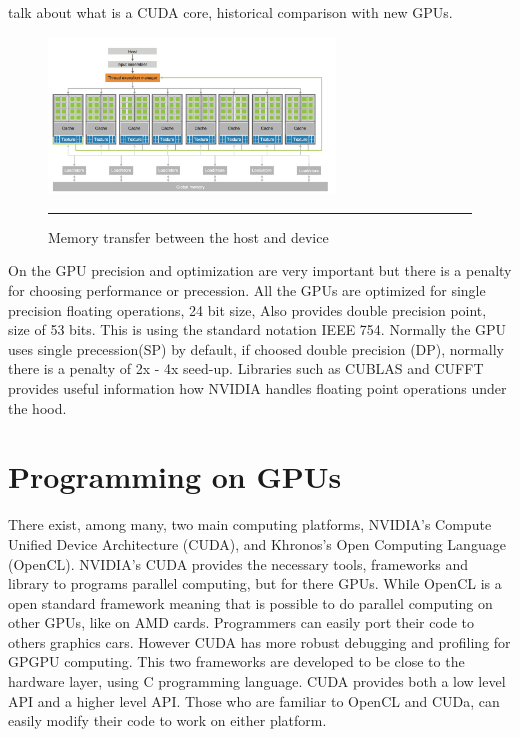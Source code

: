 talk about what is a CUDA core, historical comparison with new GPUs.

\begin{figure}[htbp]
	\centering
		\includegraphics[width=0.68\textwidth]{Figures/arch.png}
		\rule{35em}{0.5pt}
	\caption[Host and Device]{Memory transfer between the host and device}
	\label{fig:arch}
\end{figure}



On the GPU precision and optimization are very important but there is a penalty for choosing performance or precession. All the GPUs are optimized for single precision floating operations, 24 bit size, Also provides double precision point, size of  53 bits. This is using the standard notation IEEE 754. Normally the GPU uses single precession(SP) by default, if choosed double precision (DP), normally there is a penalty of  2x - 4x seed-up. \cite{precision}
Libraries such as CUBLAS and CUFFT provides useful information how NVIDIA handles floating point operations under the hood.


\section{Programming on GPUs}

There exist, among many, two main computing platforms, NVIDIA's Compute Unified Device Architecture (CUDA), and Khronos's Open Computing Language (OpenCL). NVIDIA's CUDA provides the necessary tools, frameworks and library to programs parallel computing, but for there GPUs. While OpenCL is a open standard framework meaning that is possible to do parallel computing on other GPUs, like on AMD cards. Programmers can easily port their code to others graphics cars.  However CUDA has more robust debugging and profiling for GPGPU computing. This two frameworks are developed to be close to the hardware layer, using C programming language. CUDA provides both a low level API and a higher level API. Those who are familiar to OpenCL and CUDa, can easily modify their code to work on either platform.\cite{hwu}

